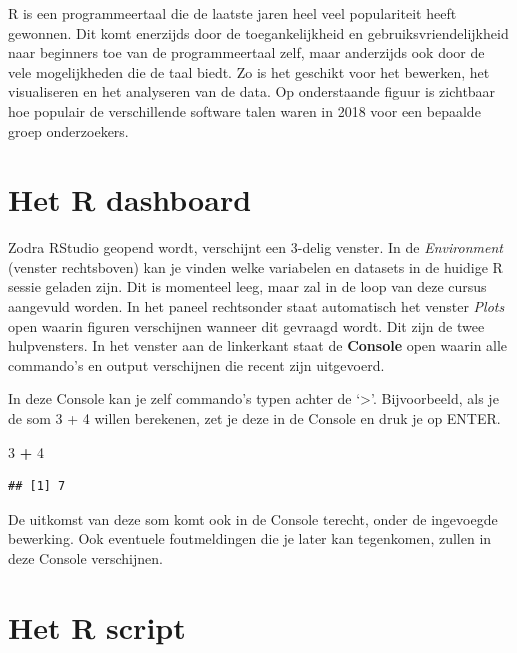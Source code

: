 \documentclass[
]{book}
\newenvironment{Shaded}{\begin{snugshade}}{\end{snugshade}}
\newcommand{\DecValTok}[1]{\textcolor[rgb]{0.00,0.00,0.81}{#1}}
\newcommand{\SpecialCharTok}[1]{\textcolor[rgb]{0.81,0.36,0.00}{\textbf{#1}}}
\begin{document}
R is een programmeertaal die de laatste jaren heel veel populariteit heeft gewonnen. Dit komt enerzijds door de toegankelijkheid en gebruiksvriendelijkheid naar beginners toe van de programmeertaal zelf, maar anderzijds ook door de vele mogelijkheden die de taal biedt. Zo is het geschikt voor het bewerken, het visualiseren en het analyseren van de data. Op onderstaande figuur is zichtbaar hoe populair de verschillende software talen waren in 2018 voor een bepaalde groep onderzoekers.

\hypertarget{het-r-dashboard}{%
\section{Het R dashboard}\label{het-r-dashboard}}

Zodra RStudio geopend wordt, verschijnt een 3-delig venster. In de \emph{Environment} (venster rechtsboven) kan je vinden welke variabelen en datasets in de huidige R sessie geladen zijn. Dit is momenteel leeg, maar zal in de loop van deze cursus aangevuld worden. In het paneel rechtsonder staat automatisch het venster \emph{Plots} open waarin figuren verschijnen wanneer dit gevraagd wordt. Dit zijn de twee hulpvensters. In het venster aan de linkerkant staat de \textbf{Console} open waarin alle commando's en output verschijnen die recent zijn uitgevoerd.

In deze Console kan je zelf commando's typen achter de `\textgreater{}'. Bijvoorbeeld, als je de som 3 + 4 willen berekenen, zet je deze in de Console en druk je op ENTER.

\begin{Shaded}
\begin{Highlighting}[]
\DecValTok{3} \SpecialCharTok{+} \DecValTok{4}
\end{Highlighting}
\end{Shaded}

\begin{verbatim}
## [1] 7
\end{verbatim}

De uitkomst van deze som komt ook in de Console terecht, onder de ingevoegde bewerking. Ook eventuele foutmeldingen die je later kan tegenkomen, zullen in deze Console verschijnen.

\hypertarget{het-r-script}{%
\section{Het R script}\label{het-r-script}}
\end{document}
